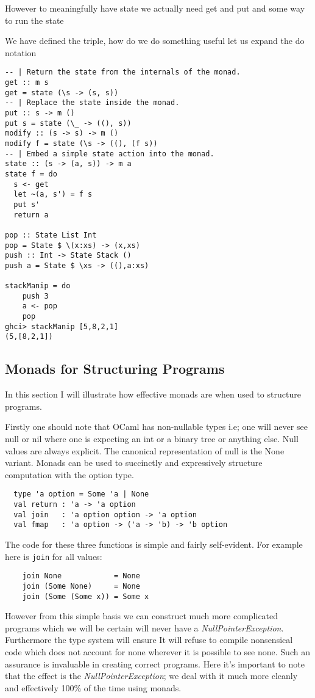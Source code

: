 However to meaningfully have state we actually need
get and put
and some way to run the state

We have defined the triple,
how do we do something useful
let us expand the do notation
\begin{verbatim}
-- | Return the state from the internals of the monad.
get :: m s
get = state (\s -> (s, s))
-- | Replace the state inside the monad.
put :: s -> m ()
put s = state (\_ -> ((), s))
modify :: (s -> s) -> m ()
modify f = state (\s -> ((), (f s))
-- | Embed a simple state action into the monad.
state :: (s -> (a, s)) -> m a
state f = do
  s <- get
  let ~(a, s') = f s
  put s'
  return a

pop :: State List Int
pop = State $ \(x:xs) -> (x,xs)
push :: Int -> State Stack ()
push a = State $ \xs -> ((),a:xs)

stackManip = do
    push 3
    a <- pop
    pop
ghci> stackManip [5,8,2,1]
(5,[8,2,1])
\end{verbatim}

\subsection{Monads for Structuring Programs}
In this section I will illustrate how effective monads are when used to structure programs.

Firstly one should note that OCaml has non-nullable types
i.e; one will never see null or nil where one is expecting an
int or a binary tree or anything else.
Null values are always explicit.
The canonical representation of null is the None variant.
Monads can be used to succinctly and expressively structure computation with the option type.

\begin{verbatim}
  type 'a option = Some 'a | None
  val return : 'a -> 'a option
  val join   : 'a option option -> 'a option
  val fmap   : 'a option -> ('a -> 'b) -> 'b option
\end{verbatim}

The code for these three functions is simple and fairly self-evident.
For example here is \texttt{join} for all values:
\begin{verbatim}
    join None            = None
    join (Some None)     = None
    join (Some (Some x)) = Some x
\end{verbatim}

However from this simple basis we can construct much more complicated programs which we
will be certain will never have a \textit{NullPointerException}.
Furthermore the type system will ensure 
It will refuse to compile nonsensical code which does not account for none
wherever it is possible to see none.
Such an assurance is invaluable in creating correct programs.
Here it's important to note that the effect is the \textit{NullPointerException};
we deal with it much more cleanly and effectively 100\% of the time using monads.

